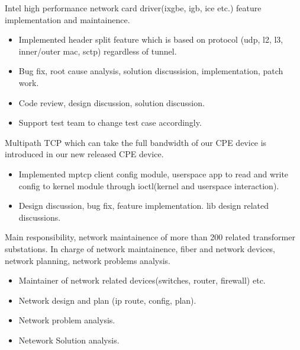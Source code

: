 \documentclass{resume}
\begin{document}
Intel high performance network card driver(ixgbe, igb, ice etc.) feature implementation and maintainence.
\begin{itemize}
	\item Implemented header split feature which is based on protocol (udp, l2, l3, inner/outer mac, sctp) regardless of tunnel.
  \item Bug fix, root cause analysis, solution discussision, implementation, patch work. 
  \item Code review, design discussion, solution discussion.
  \item Support test team to change test case accordingly.
\end{itemize}

Multipath TCP which can take the full bandwidth of our CPE device  is introduced in our new released CPE device.
\begin{itemize}
	\item Implemented mptcp client config module, userspace app to read and write config to kernel module through ioctl(kernel and userspace interaction).
\item Design discussion, bug fix, feature implementation. lib design related discussions. 
\end{itemize}

Main responsibility, network maintainence of more than 200 related transformer substations.
In charge of network maintainence, fiber and network devices, network planning, network problems analysis.
\begin{itemize}
\item Maintainer of network related devices(switches, router, firewall) etc.
\item Network design and plan (ip route, config, plan).
\item Network problem analysis.
\item Netework Solution analysis.
\end{itemize}


\end{document}

